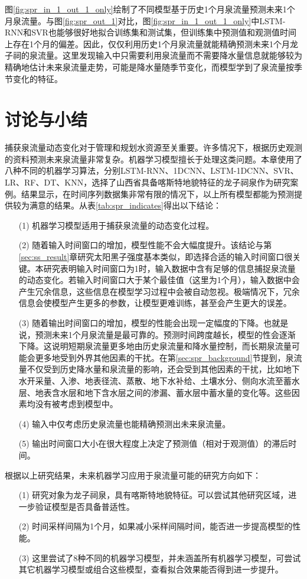 图\ref{fig:spr_in_1_out_1_only}绘制了不同模型基于历史1个月泉流量预测未来1个月泉流量。与图\ref{fig:spr_out_1}对比，图\ref{fig:spr_in_1_out_1_only}中LSTM-RNN和SVR也能够很好地拟合训练集和测试集，但训练集中预测值和观测值时间上存在1个月的偏差。因此，仅仅利用历史1个月泉流量就能精确预测未来1个月龙子祠的泉流量。这里发现输入中只需要利用泉流量而不需要降水量信息就能够较为精确地估计未来泉流量走势，可能是降水量随季节变化，而模型学到了泉流量按季节变化的特征。

\section{讨论与小结}\label{sec:spr_conclusion}

捕获泉流量动态变化对于管理和规划水资源至关重要。许多情况下，根据历史观测的资料预测未来泉流量非常复杂。机器学习模型擅长于处理这类问题。本章使用了八种不同的机器学习算法，分别LSTM-RNN、1DCNN、LSTM-1DCNN、SVR、LR、RF、DT、KNN，选择了山西省具备喀斯特地貌特征的龙子祠泉作为研究案例。结果显示，在时间序列数据集非常有限的情况下，以上所有模型都能为预测提供较为满意的结果。从表\ref{tab:spr_indicates}得出以下结论：
\begin{enumerate}
  \item[(1)] 机器学习模型适用于捕获泉流量的动态变化过程。
  \item[(2)] 随着输入时间窗口的增加，模型性能不会大幅度提升。该结论与第\ref{sec:ss_result}章研究太阳黑子强度基本类似，即选择合适的输入时间窗口很关键。本研究表明输入时间窗口为1时，输入数据中含有足够的信息捕捉泉流量的动态变化。若输入时间窗口大于某个最佳值（这里为1个月），输入数据中会产生冗余信息，这些信息在模型学习过程中会被自动忽视。极端情况下，冗余信息会使模型产生更多的参数，让模型更难训练，甚至会产生更大的误差。
  \item[(3)] 随着输出时间窗口的增加，模型的性能会出现一定幅度的下降。也就是说，预测未来1个月泉流量是最可靠的。预测时间跨度越长，模型的性会逐渐下降。这说明短期泉流量更多地由历史泉流量和降水量控制，而长期泉流量可能会更多地受到外界其他因素的干扰。在第\ref{sec:spr_background}节提到，泉流量不仅受到历史降水量和泉流量的影响，还会受到其他因素的干扰，比如地下水开采量、入渗、地表径流、蒸散、地下水补给、土壤水分、侧向水流至蓄水层、地表含水层和地下含水层之间的渗漏、蓄水层中蓄水量的变化等。这些因素均没有被考虑到模型中。
  \item[(4)] 输入中仅考虑历史泉流量也能精确预测出未来泉流量。
  \item[(5)] 输出时间窗口大小在很大程度上决定了预测值（相对于观测值）的滞后时间。
\end{enumerate}

根据以上研究结果，未来机器学习应用于泉流量可能的研究方向如下：
\begin{enumerate}
  \item[(1)] 研究对象为龙子祠泉，具有喀斯特地貌特征。可以尝试其他研究区域，进一步验证模型是否具备普适性。
  \item[(2)] 时间采样间隔为1个月，如果减小采样间隔时间，能否进一步提高模型的性能。
  \item[(3)] 这里尝试了8种不同的机器学习模型，并未涵盖所有机器学习模型，可尝试其它机器学习模型或组合这些模型，查看拟合效果能否得到进一步提升。
\end{enumerate}



